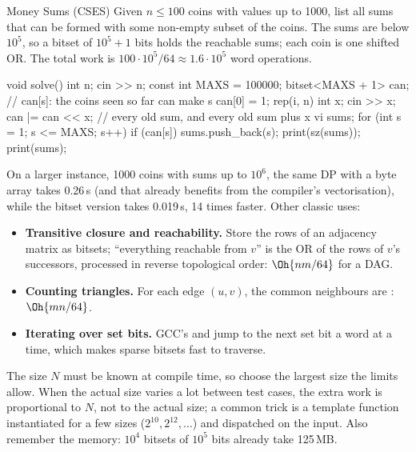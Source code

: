 \begin{problem}{Money Sums (CSES)}
Given $n \le 100$ coins with values up to 1000, list all sums that can be formed with some non-empty subset of the coins.
\solution The sums are below $10^5$, so a bitset of $10^5 + 1$ bits holds the reachable sums; each coin is one shifted OR.
The total work is $100 \cdot 10^5 / 64 \approx 1.6 \cdot 10^5$ word operations.
\end{problem}

\begin{code}
void solve() {
    int n;
    cin >> n;
    const int MAXS = 100000;
    bitset<MAXS + 1> can;  // can[s]: the coins seen so far can make s
    can[0] = 1;
    rep(i, n) {
        int x;
        cin >> x;
        can |= can << x;  // every old sum, and every old sum plus x
    }
    vi sums;
    for (int s = 1; s <= MAXS; s++) if (can[s]) sums.push_back(s);
    print(sz(sums));
    print(sums);
}
\end{code}


On a larger instance, 1000 coins with sums up to $10^6$, the same DP with a byte array takes 0.26\,s (and that already benefits
from the compiler's vectorisation), while the bitset version takes 0.019\,s, 14 times faster. Other classic uses:
\begin{itemize}
  \item \textbf{Transitive closure and reachability.} Store the rows of an adjacency matrix as bitsets; ``everything reachable
        from $v$'' is the OR of the rows of $v$'s successors, processed in reverse topological order: $\Oh{nm/64}$ for a DAG.
  \item \textbf{Counting triangles.} For each edge $(u, v)$, the common neighbours are :
        $\Oh{m n / 64}$.
  \item \textbf{Iterating over set bits.} GCC's  and  jump to the next set bit a word
        at a time, which makes sparse bitsets fast to traverse.
\end{itemize}

\begin{pitfall}
The size $N$ must be known at compile time, so choose the largest size the limits allow. When the actual size varies a lot
between test cases, the extra work is proportional to $N$, not to the actual size; a common trick is a template function
 instantiated for a few sizes ($2^{10}, 2^{12}, \ldots$) and dispatched on the input. Also
remember the memory: $10^4$ bitsets of $10^5$ bits already take 125\,MB.
\end{pitfall}

